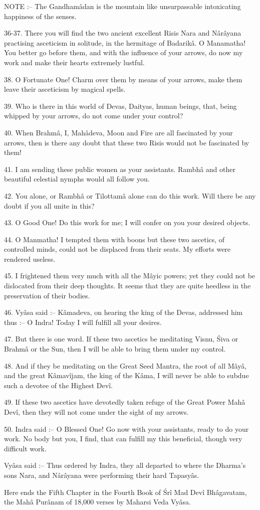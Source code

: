 NOTE :-- The Gandham\^adan is the mountain like unsurpassable intoxicating happiness of the senses.

36-37. There you will find the two ancient excellent Risis Nara and N\^ar\^ayana practising asceticism in solitude, in the hermitage of Badarik\^a. O Manamatha! You better go before them, and with the influence of your arrows, do now my work and make their hearts extremely lustful.

38. O Fortunate One! Charm over them by means of your arrows, make them leave their asceticism by magical spells.

39. Who is there in this world of Devas, Daityas, human beings, that, being whipped by your arrows, do not come under your control?

40. When Brahm\^a, I, Mah\^adeva, Moon and Fire are all fascinated by your arrows, then is there any doubt that these two Risis would not be fascinated by them!

41. I am sending these public women as your assistants. Rambh\^a and other beautiful celestial nymphs would all follow you.

42. You alone, or Rambh\^a or Tilottam\^a alone can do this work. Will there be any doubt if you all unite in this?

43. O Good One! Do this work for me; I will confer on you your desired objects.

44. O Manmatha! I tempted them with boons but these two ascetics, of controlled minds, could not be displaced from their seats. My efforts were rendered useless.

45. I frightened them very much with all the M\^ayic powers; yet they could not be dislocated from their deep thoughts. It seems that they are quite heedless in the preservation of their bodies.

46. Vy\^asa said :-- K\^amadeva, on hearing the king of the Devas, addressed him thus :-- O Indra! Today I will fulfill all your desires.

47. But there is one word. If these two ascetics be meditating Visnu, \'Siva or Brahm\^a or the Sun, then I will be able to bring them under my control.

48. And if they be meditating on the Great Seed Mantra, the root of all M\^ay\^a, and the great K\^amav\^ijam, the king of the K\^ama, I will never be able to subdue such a devotee of the Highest Dev\^i.

49. If these two ascetics have devotedly taken refuge of the Great Power Mah\^a Dev\^i, then they will not come under the sight of my arrows.

50. Indra said :-- O Blessed One! Go now with your assistants, ready to do your work. No body but you, I find, that can fulfill my this beneficial, though very difficult work.

Vy\^asa said :-- Thus ordered by Indra, they all departed to where the Dharma's sons Nara, and N\^ar\^ayana were performing their hard Tapasy\^as.

Here ends the Fifth Chapter in the Fourth Book of \'Sr\^i Mad Dev\^i Bh\^agavatam, the Mah\^a Pur\^anam of 18,000 verses by Maharsi Veda Vy\^asa.